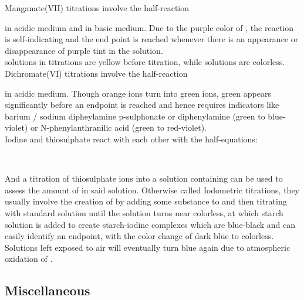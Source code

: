 \documentclass[../main]{subfiles}
\begin{document}
	Manganate(VII) titrations involve the half-reaction 
	\begin{center} \end{center}
	in acidic medium and  in basic medium. Due to the purple color of , the reaction is self-indicating and the end point is reached whenever there is an appearance or disappearance of purple tint in the solution.\\

	 solutions in  titrations are yellow before titration, while  solutions are colorless. \\

	Dichromate(VI) titrations involve the half-reaction 
	\begin{center}  \end{center}
	in acidic medium. Though orange  ions turn into green  ions, green appears significantly before an endpoint is reached and hence requires indicators like barium / sodium dipheylamine p-sulphonate or diphenylamine (green to blue-violet) or N-phenylanthranilic acid (green to red-violet). \\

	Iodine and thiosulphate react with each other with the half-equations:

	\begin{center}
		 \\
	\end{center} 

	And a titration of thiosulphate ions into a solution containing  can be used to assess the amount of  in said solution. Otherwise called Iodometric titrations, they usually involve the creation of  by adding some substance to  and then titrating with standard  solution until the solution turns near colorless, at which starch solution is added to create starch-iodine complexes which are blue-black and can easily identify an endpoint, with the color change of dark blue to colorless. Solutions left exposed to air will eventually turn blue again due to atmospheric oxidation of .

	\subsection{Miscellaneous}

\end{document}
